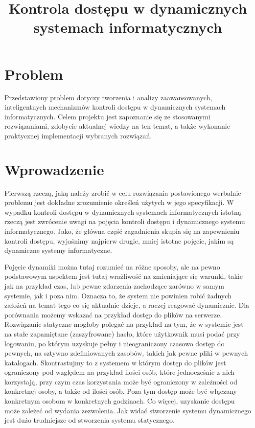 \documentclass{classrep}
\author{%
  \studentinfo{Mateusz Grotek}{186816} \and
  \studentinfo{Mateusz Jakóbczak}{186819} \and
  \studentinfo{Rafał Jurkiewicz}{186822} \and
  \studentinfo{Łukasz Kotyński}{186829} \and
  \studentinfo{Paweł Tarasiuk}{186875}
}
\title{Kontrola dostępu w dynamicznych systemach informatycznych}
\begin{document}
\maketitle

\section{Problem}
Przedstawiony problem dotyczy tworzenia i analizy zaawansowanych, inteligentnych mechanizmów kontroli dostępu w dynamicznych systemach informatycznych. Celem projektu jest
zapoznanie się ze stosowanymi rozwiązaniami, zdobycie aktualnej wiedzy na ten temat, a także wykonanie praktycznej implementacji wybranych rozwiązań.
\section{Wprowadzenie}
Pierwszą rzeczą, jaką należy zrobić w celu rozwiązania postawionego werbalnie problemu jest dokładne zrozumienie określeń użytych w jego specyfikacji. W wypadku
kontroli dostępu w dynamicznych systemach informatycznych istotną rzeczą jest zwrócenie uwagi na pojęcia kontroli dostępu i dynamicznego systemu informatycznego. Jako, że główna
część zagadnienia skupia się na zapewnieniu kontroli dostępu, wyjaśnimy najpierw drugie, mniej istotne pojęcie, jakim są dynamiczne systemy informatyczne.

Pojęcie dynamiki można tutaj
rozumieć na różne sposoby, ale na pewno podstawowym aspektem jest tutaj wrażliwość na zmieniające się warunki, takie jak na przykład czas, lub pewne zdarzenia zachodzące zarówno 
w samym systemie, jak i poza nim. Oznacza to, że system nie powinien robić żadnych założeń na temat tego co się aktualnie dzieje, a raczej reagować dynamicznie. Dla porównania
możemy wskazać na przykład dostęp do plików na serwerze. Rozwiązanie statyczne mogłoby polegać na przykład na tym, że w systemie jest na stałe zapamiętane (zaszyfrowane) hasło,
które użytkownik musi podać przy logowaniu, po którym uzyskuje pełny i nieograniczony czasowo dostęp do pewnych, na sztywno zdefiniowanych zasobów, takich jak pewne pliki w pewnych katalogach.
Skontrastujmy to z systemem w którym dostęp do plików jest ograniczony pod względem na przykład ilości osób, które jednocześnie z nich korzystają, przy czym czas korzystania może być ograniczony
w zależności od konkretnej osoby, a także od ilości osób. Poza tym dostęp może być włączany konkretnym osobom w konkretnych godzinach. Co więcej, uzyskanie dostępu może zależeć od
wydania zezwolenia. Jak widać stworzenie systemu dynamicznego jest dużo trudniejsze od stworzenia systemu statycznego.
\end{document}
